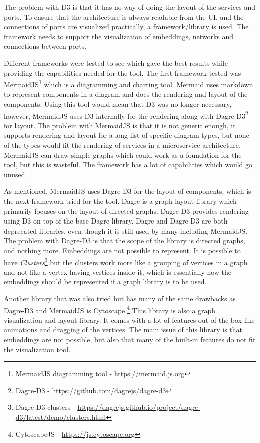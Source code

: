 The problem with D3 is that it has no way of doing the layout of the services and ports.
To ensure that the architecture is always readable from the UI, and the connections of ports are visualized practically, a framework/library is used.
The framework needs to support the visualization of embeddings, networks and connections between ports.

Different frameworks were tested to see which gave the best results while providing the capabilities needed for the tool.
The first framework tested was MermaidJS\footnote{MermaidJS diagramming tool - \url{https://mermaid.js.org}} which is a diagramming and charting tool. Mermaid uses markdown to represent components in a diagram and does the rendering and layout of the components. Using this tool would mean that D3 was no longer necessary, however, MermaidJS uses D3 internally for the rendering along with Dagre-D3\footnote{Dagre-D3 - \url{https://github.com/dagrejs/dagre-d3}} for layout.
The problem with MermaidJS is that it is not generic enough, it supports rendering and layout for a long list of specific diagram types, but none of the types would fit the rendering of services in a microservice architecture.
MermaidJS can draw simple graphs which could work as a foundation for the tool, but this is wasteful. The framework has a lot of capabilities which would go unused.

As mentioned, MermaidJS uses Dagre-D3 for the layout of components, which is the next framework tried for the tool.
Dagre is a graph layout library which primarily focuses on the layout of directed graphs. Dagre-D3 provides rendering using D3 on top of the base Dagre library.
Dagre and Dagre-D3 are both deprecated libraries, even though it is still used by many including MermaidJS.
The problem with Dagre-D3 is that the scope of the library is directed graphs, and nothing more.
Embeddings are not possible to represent.
It is possible to have \textit{Clusters}\footnote{Dagre-D3 clusters - \url{https://dagrejs.github.io/project/dagre-d3/latest/demo/clusters.html}}
but the clusters work more like a grouping of vertices in a graph and not like a vertex having vertices inside it, which is essentially how the embeddings should be represented if a graph library is to be used.

Another library that was also tried but has many of the same drawbacks as Dagre-D3 and MermaidJS is Cytoscape.\footnote{CytoscapeJS - \url{https://js.cytoscape.org}}
This library is also a graph visualization and layout library. It comes with a lot of features out of the box like animations and dragging of the vertices. The main issue of this library is that embeddings are
not possible, but also that many of the built-in features do not fit the visualization tool.

